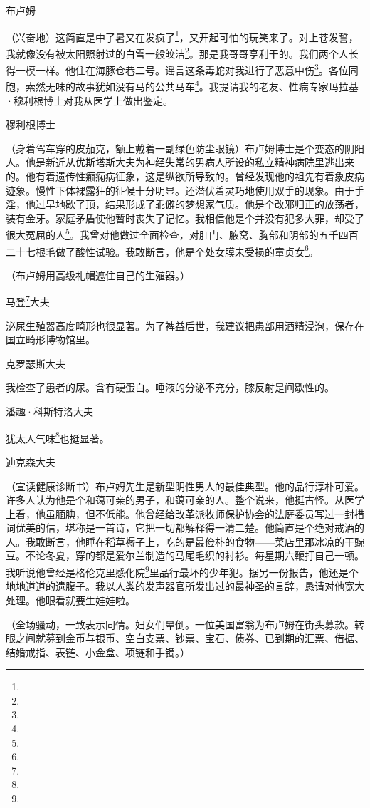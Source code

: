 \par 布卢姆
\par （兴奋地）这简直是中了暑又在发疯了\footnote{}，又开起可怕的玩笑来了。对上苍发誓，我就像没有被太阳照射过的白雪一般皎洁\footnote{}。那是我哥哥亨利干的。我们两个人长得一模一样。他住在海豚仓巷二号。谣言这条毒蛇对我进行了恶意中伤\footnote{}。各位同胞，索然无味的故事犹如没有马的公共马车\footnote{}。我提请我的老友、性病专家玛拉基·穆利根博士对我从医学上做出鉴定。
\par 穆利根博士
\par （身着驾车穿的皮茄克，额上戴着一副绿色防尘眼镜）布卢姆博士是个变态的阴阳人。他是新近从优斯塔斯大夫为神经失常的男病人所设的私立精神病院里逃出来的。他有着遗传性癫痫病征象，这是纵欲所导致的。曾经发现他的祖先有着象皮病迹象。慢性下体裸露狂的征候十分明显。还潜伏着灵巧地使用双手的现象。由于手淫，他过早地歇了顶，结果形成了乖僻的梦想家气质。他是个改邪归正的放荡者，装有金牙。家庭矛盾使他暂时丧失了记忆。我相信他是个并没有犯多大罪，却受了很大冤屈的人\footnote{}。我曾对他做过全面检查，对肛门、腋窝、胸部和阴部的五千四百二十七根毛做了酸性试验。我敢断言，他是个处女膜未受损的童贞女\footnote{}。
\par （布卢姆用高级礼帽遮住自己的生殖器。）
\par 马登\footnote{}大夫
\par 泌尿生殖器高度畸形也很显著。为了裨益后世，我建议把患部用酒精浸泡，保存在国立畸形博物馆里。
\par 克罗瑟斯大夫
\par 我检查了患者的尿。含有硬蛋白。唾液的分泌不充分，膝反射是间歇性的。
\par 潘趣·科斯特洛大夫
\par 犹太人气味\footnote{}也挺显著。
\par 迪克森大夫
\par （宣读健康诊断书）布卢姆先生是新型阴性男人的最佳典型。他的品行淳朴可爱。许多人认为他是个和蔼可亲的男子，和蔼可亲的人。整个说来，他挺古怪。从医学上看，他虽腼腆，但不低能。他曾经给改革派牧师保护协会的法庭委员写过一封措词优美的信，堪称是一首诗，它把一切都解释得一清二楚。他简直是个绝对戒酒的人。我敢断言，他睡在稻草褥子上，吃的是最俭朴的食物——菜店里那冰凉的干豌豆。不论冬夏，穿的都是爱尔兰制造的马尾毛织的衬衫。每星期六鞭打自己一顿。我听说他曾经是格伦克里感化院\footnote{}里品行最坏的少年犯。据另一份报告，他还是个地地道道的遗腹子。我以人类的发声器官所发出过的最神圣的言辞，恳请对他宽大处理。他眼看就要生娃娃啦。
\par （全场骚动，一致表示同情。妇女们晕倒。一位美国富翁为布卢姆在街头募款。转眼之间就募到金币与银币、空白支票、钞票、宝石、债券、已到期的汇票、借据、结婚戒指、表链、小金盒、项链和手镯。）
